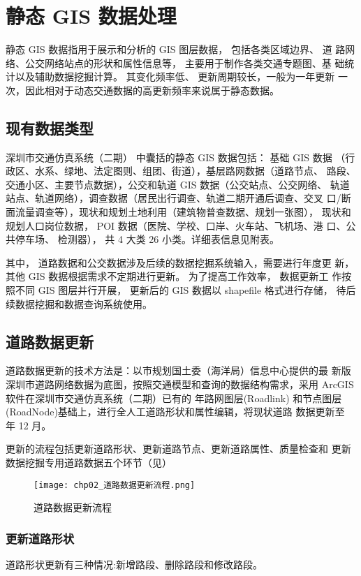 \section{静态 GIS 数据处理} \label{sec:静态GIS数据处理}
静态 GIS 数据指用于展示和分析的 GIS 图层数据， 包括各类区域边界、 道
路网络、公交网络站点的形状和属性信息等， 主要用于制作各类交通专题图、基
础统计以及辅助数据挖掘计算。 其变化频率低、 更新周期较长，一般为一年更新
一次，因此相对于动态交通数据的高更新频率来说属于静态数据。

\subsection{现有数据类型} \label{sec:现有数据类型}
深圳市交通仿真系统（二期） 中囊括的静态 GIS 数据包括： 基础 GIS 数据
（行政区、水系、绿地、法定图则、组团、街道），基层路网数据（道路节点、
路段、交通小区、主要节点数据），公交和轨道 GIS 数据（公交站点、公交网络、
轨道站点、轨道网络），调查数据（居民出行调查、轨道二期开通后调查、交叉
口/断面流量调查等），现状和规划土地利用（建筑物普查数据、规划一张图），
现状和规划人口岗位数据， POI 数据（医院、学校、口岸、火车站、飞机场、港
口、公共停车场、 检测器）， 共 4 大类 26 小类。详细表信息见附表。

其中， 道路数据和公交数据涉及后续的数据挖掘系统输入，需要进行年度更
新，其他 GIS 数据根据需求不定期进行更新。 为了提高工作效率， 数据更新工
作按照不同 GIS 图层并行开展， 更新后的 GIS 数据以 shapefile 格式进行存储，
待后续数据挖掘和数据查询系统使用。

\subsection{道路数据更新}
道路数据更新的技术方法是：以市规划国土委（海洋局）信息中心提供的最
新版深圳市道路网络数据为底图，按照交通模型和查询的数据结构需求，采用
ArcGIS 软件在深圳市交通仿真系统（二期）已有的 \ppyear 年路网图层(Roadlink)
和节点图层(RoadNode)基础上，进行全人工道路形状和属性编辑，将现状道路
数据更新至 \pyear 年 12 月。

更新的流程包括更新道路形状、更新道路节点、更新道路属性、质量检查和
更新数据挖掘专用道路数据五个环节（见）

\begin{figure}[ht]
  \centering
  \texttt{[image: chp02\_道路数据更新流程.png]}
  \caption{道路数据更新流程\label{fig:道路数据更新流程} }
\end{figure}

\subsubsection{更新道路形状}
道路形状更新有三种情况:新增路段、删除路段和修改路段。

